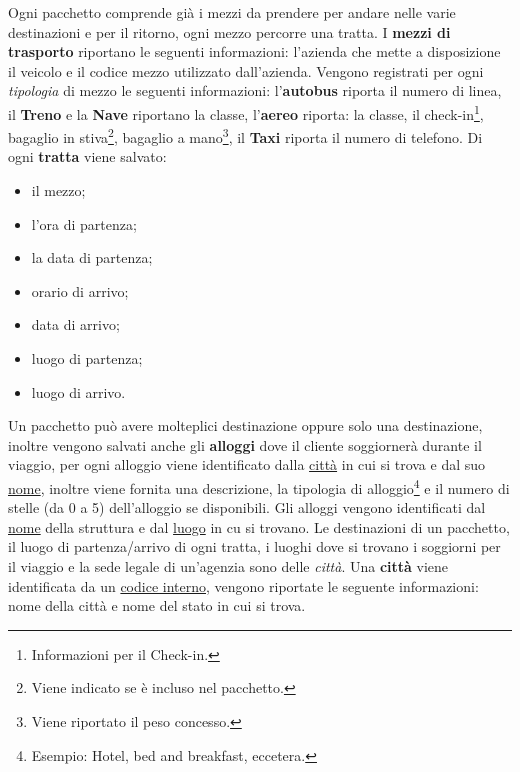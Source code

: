 %
%
Ogni pacchetto comprende già i mezzi da prendere per andare nelle varie destinazioni e per il ritorno, ogni mezzo percorre una tratta. I \textbf{mezzi di trasporto} riportano le seguenti informazioni: l'azienda che mette a disposizione il veicolo e il codice mezzo utilizzato dall'azienda. Vengono registrati per ogni \emph{tipologia} di mezzo le seguenti informazioni:
l'\textbf{autobus} riporta il numero di linea,
il \textbf{Treno} e la \textbf{Nave} riportano la classe,
l'\textbf{aereo} riporta:
la classe,
il check-in\footnote{Informazioni per il Check-in.},
bagaglio in stiva\footnote{Viene indicato se è incluso nel pacchetto.},
bagaglio a mano\footnote{Viene riportato il peso concesso.},
il \textbf{Taxi} riporta il numero di telefono.
%
%
Di ogni \textbf{tratta} viene salvato:
\begin{multicols}{3}
    \begin{itemize}
        \item il mezzo;
        \item l'ora di partenza;
        \item la data di partenza;
        \item orario di arrivo;
        \item data di arrivo;
        \item luogo di partenza;
        \item luogo di arrivo.
    \end{itemize}
\end{multicols}

%
%
Un pacchetto può avere molteplici destinazione oppure solo una destinazione, inoltre vengono salvati anche gli \textbf{alloggi} dove il cliente soggiornerà durante il viaggio, per ogni alloggio viene identificato dalla \underline{città} in cui si trova e dal suo \underline{nome}, inoltre viene fornita una descrizione, la tipologia di alloggio\footnote{Esempio: Hotel, bed and breakfast, eccetera.} e il numero di stelle (da 0 a 5) dell'alloggio se disponibili. Gli alloggi vengono identificati dal \underline{nome} della struttura e dal \underline{luogo} in cu si trovano.
%
%
Le destinazioni di un pacchetto, il luogo di partenza/arrivo di ogni tratta, i luoghi dove si trovano i soggiorni per il viaggio e la sede legale di un'agenzia sono delle \emph{città}. Una \textbf{città} viene identificata da un \underline{codice interno}, vengono riportate le seguente informazioni: nome della città e nome del stato in cui si trova.


